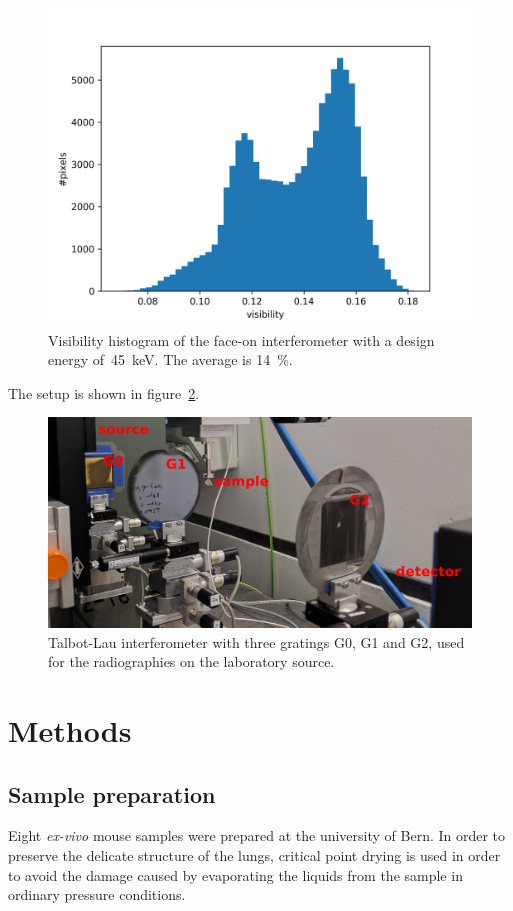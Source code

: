 \begin{figure}[htb]
    \centering
    \includegraphics[width=.8\textwidth]{gfx/visibility_titlis.png}
    \caption{Visibility histogram of the face-on interferometer with a
        design energy of~\SI{45}{\kilo\eV}. The average is
        \SI{14}{\percent}.}
    \label{fig:visibility-titlis}
\end{figure}

The setup is shown in figure~\ref{248327}.

\begin{figure}[htb]
    \centering
    \includegraphics[width=0.70\columnwidth]{gfx/lung-paper-figures/lung-setup/lung-setup}
    \caption{{Talbot-Lau interferometer with three gratings G0, G1 and G2, used for
        the radiographies on the laboratory source.
        {\label{248327}}%
    }}
\end{figure}

\section{Methods}\label{sec:methods}
\subsection{Sample preparation}
Eight \emph{ex-vivo} mouse samples were prepared at the university of Bern.
In order to preserve the delicate structure of the lungs, critical point
drying is used in order to avoid the damage caused by evaporating the liquids
from the sample in ordinary pressure conditions.

